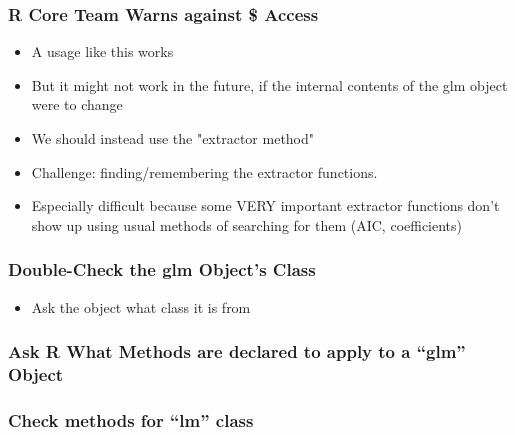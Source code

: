 \documentclass[10pt,english]{beamer}
\begin{document}
\begin{frame}[containsverbatim]
  \frametitle{R Core Team Warns against \$ Access}
  \begin{itemize}
  \item A usage like this works



 \item But it might not work in the future, if the internal contents
   of the glm object were to change

 \item We should instead use the "extractor method"


  \item Challenge: finding/remembering the extractor functions.
  \item Especially difficult because some VERY important extractor
    functions don't show up using usual methods of searching for them
    (AIC, coefficients)
  \end{itemize}
\end{frame}


\begin{frame}[containsverbatim]
  \frametitle{Double-Check the glm Object's Class}

  \begin{itemize}
  \item Ask the object what class it is from



  \end{itemize}
\end{frame}


\begin{frame}
  \frametitle{Ask R What Methods are declared to apply to a ``glm'' Object}



\end{frame}



\begin{frame}
  \frametitle{Check methods for ``lm'' class}



\end{frame}



\end{document}
